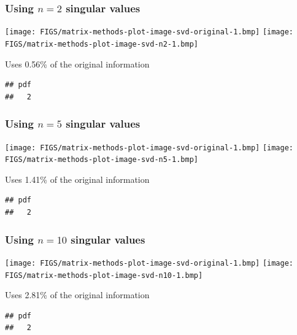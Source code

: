 \documentclass[aspectratio=169]{beamer}\usepackage[]{graphicx}\usepackage[]{xcolor}
\makeatletter
\newenvironment{kframe}{%
 \def\at@end@of@kframe{}%
 \ifinner\ifhmode%
  \def\at@end@of@kframe{\end{minipage}}%
  \begin{minipage}{\columnwidth}%
 \fi\fi%
 \def\FrameCommand##1{\hskip\@totalleftmargin \hskip-\fboxsep
 \colorbox{shadecolor}{##1}\hskip-\fboxsep
     \hskip-\linewidth \hskip-\@totalleftmargin \hskip\columnwidth}%
 \MakeFramed {\advance\hsize-\width
   \@totalleftmargin\z@ \linewidth\hsize
   \@setminipage}}%
 {\par\unskip\endMakeFramed%
 \at@end@of@kframe}
\newenvironment{knitrout}{}{} %
\makeatother
\begin{document}
\begin{frame}\frametitle{Using $n=2$ singular values}
\begin{center}
\texttt{[image: FIGS/matrix-methods-plot-image-svd-original-1.bmp]}
\texttt{[image: FIGS/matrix-methods-plot-image-svd-n2-1.bmp]}
\end{center}
\vfill
Uses 0.56\% of the original information
\end{frame}

\begin{knitrout}
\color{fgcolor}\begin{kframe}
\begin{verbatim}
## pdf 
##   2
\end{verbatim}
\end{kframe}
\end{knitrout}

\begin{frame}\frametitle{Using $n=5$ singular values}
\begin{center}
\texttt{[image: FIGS/matrix-methods-plot-image-svd-original-1.bmp]}
\texttt{[image: FIGS/matrix-methods-plot-image-svd-n5-1.bmp]}
\end{center}
\vfill
Uses 1.41\% of the original information
\end{frame}


\begin{knitrout}
\color{fgcolor}\begin{kframe}
\begin{verbatim}
## pdf 
##   2
\end{verbatim}
\end{kframe}
\end{knitrout}

\begin{frame}\frametitle{Using $n=10$ singular values}
\begin{center}
\texttt{[image: FIGS/matrix-methods-plot-image-svd-original-1.bmp]}
\texttt{[image: FIGS/matrix-methods-plot-image-svd-n10-1.bmp]}
\end{center}
\vfill
Uses 2.81\% of the original information
\end{frame}



\begin{knitrout}
\color{fgcolor}\begin{kframe}
\begin{verbatim}
## pdf 
##   2
\end{verbatim}
\end{kframe}
\end{knitrout}
\end{document}
